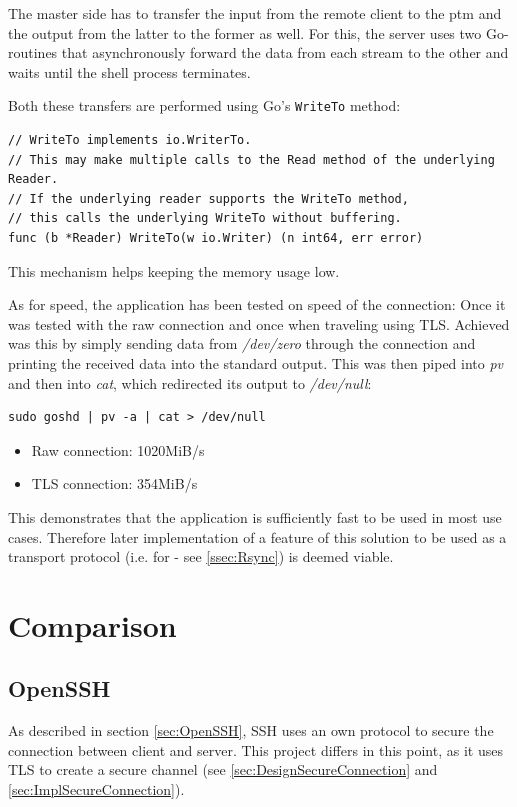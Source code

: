 \documentclass[10pt,a4paper,titlepage,twoside,english,final]{zhawreprt}
\begin{document}
The master side has to transfer the input from the remote client to the \gls{ptm} and the output from the latter to the former as well.
For this, the server uses two \gls{Go}-routines that asynchronously forward the data from each stream to the other and waits until the shell process terminates.

Both these transfers are performed using \gls{Go}'s \texttt{WriteTo} method:
\setlistingGo
\begin{lstlisting}[caption={\texttt{WriteTo} method of \gls{Go}},label=lst:GoWriteTo]
// WriteTo implements io.WriterTo.
// This may make multiple calls to the Read method of the underlying Reader.
// If the underlying reader supports the WriteTo method,
// this calls the underlying WriteTo without buffering.
func (b *Reader) WriteTo(w io.Writer) (n int64, err error)
\end{lstlisting}

This mechanism helps keeping the memory usage low.

As for speed, the application has been tested on speed of the connection:
Once it was tested with the raw connection and once when traveling using \gls{TLS}.
Achieved was this by simply sending data from \textit{/dev/zero} through the connection and printing the received data into the standard output.
This was then piped into \textit{pv} and then into \textit{cat}, which redirected its output to \textit{/dev/null}:

\setlistingBash
\begin{lstlisting}[caption={Throughput measurement},label=lst:ThroughputMeasurement]
sudo goshd | pv -a | cat > /dev/null
\end{lstlisting}

\begin{itemize}
\item Raw connection: 1020MiB/s
\item \gls{TLS} connection: 354MiB/s
\end{itemize}

This demonstrates that the application is sufficiently fast to be used in most use cases.
Therefore later implementation of a feature of this solution to be used as a transport protocol (i.e. for \cite{rsync} - see \ref{ssec:Rsync}) is deemed viable.


\section{Comparison}\label{sec:Comparison}
\subsection{OpenSSH}\label{ssec:CompOpenSSH}
As described in section \ref{sec:OpenSSH}, \gls{SSH} uses an own protocol to secure the connection between client and server.
This project differs in this point, as it uses \gls{TLS} to create a secure channel (see \ref{sec:DesignSecureConnection} and \ref{sec:ImplSecureConnection}).
\end{document}
